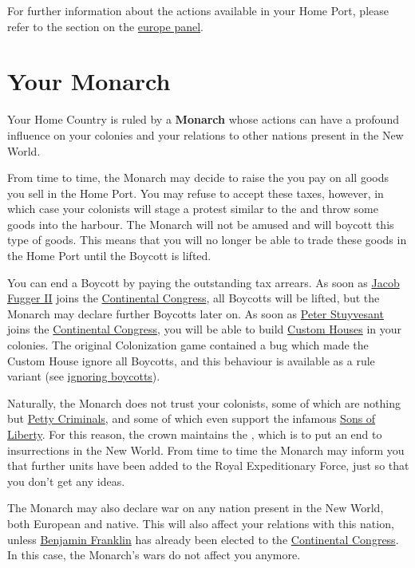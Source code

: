 \documentclass[12pt]{book}
\begin{document}
For further information about the actions available in your Home Port,
please refer to the section on the \hyperlink{europe panel}{europe panel}.


\hypertarget{Monarch}{\section{Your Monarch}}

Your Home Country is ruled by a \textbf{Monarch} whose actions can
have a profound influence on your colonies and your relations to other
nations present in the New World. 

From time to time, the Monarch may decide to raise the
 you pay on all goods you sell in the Home
Port. You may refuse to accept these taxes, however, in which case
your colonists will stage a protest similar to the  and throw some goods into the harbour. The Monarch will not be
amused and will  \hypertarget{Boycotts}{boycott} this
type of goods. This means that you will no longer be able to trade
these goods in the Home Port until the Boycott is lifted.

You can end a Boycott by paying the outstanding tax arrears. As soon
as \hyperlink{Jacob Fugger II}{Jacob Fugger II} joins the
\hyperlink{Continental Congress}{Continental Congress}, all Boycotts
will be lifted, but the Monarch may declare further Boycotts later
on. As soon as \hyperlink{Peter Stuyvesant}{Peter Stuyvesant} joins
the \hyperlink{Continental Congress}{Continental Congress}, you will
be able to build \hyperlink{Custom House}{Custom Houses} in your
colonies. The original Colonization game contained a bug which made
the Custom House ignore all Boycotts, and this behaviour is available
as a rule variant (see \hyperlink{ignore boycotts}{ignoring boycotts}).

Naturally, the Monarch does not trust your colonists, some of which
are nothing but \hyperlink{Petty Criminal}{Petty Criminals}, and some
of which even support the infamous \hyperlink{Sons of Liberty}{Sons of
Liberty}. For this reason, the crown maintains the
, which is to put an end to
insurrections in the New World. From time to time the Monarch may
inform you that further units have been added to the Royal
Expeditionary Force, just so that you don't get any ideas.

The Monarch may also declare war on any nation present in the New
World, both European and native. This will also affect your relations
with this nation, unless \hyperlink{Benjamin Franklin}{Benjamin
Franklin} has already been elected to the \hyperlink{Continental
Congress}{Continental Congress}. In this case, the Monarch's wars do
not affect you anymore.
\end{document}
